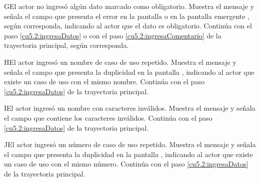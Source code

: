  \begin{UCtrayectoriaA}{G}{El actor no ingresó algún dato marcado como obligatorio.}
    \UCpaso[\UCsist] Muestra el mensaje  y señala el campo que presenta el error en la pantalla 
	     o en la pantalla emergente , según corresponda, indicando al actor que el dato es obligatorio.
    \UCpaso[] Continúa con el paso \ref{cu5.2:ingresaDatos} o con el paso \ref{cu5.2:ingresaComentario} de la trayectoria principal, según corresponda.
 \end{UCtrayectoriaA}
 \begin{UCtrayectoriaA}{H}{El actor ingresó un nombre de caso de uso repetido.}
    \UCpaso[\UCsist] Muestra el mensaje  y señala el campo que presenta la duplicidad en la pantalla 
	    , indicando al actor que existe un caso de uso con el mismo nombre.
    \UCpaso[] Continúa con el paso \ref{cu5.2:ingresaDatos} de la trayectoria principal.
 \end{UCtrayectoriaA}
 \begin{UCtrayectoriaA}{I}{El actor ingresó un nombre con caracteres inválidos.}
    \UCpaso[\UCsist] Muestra el mensaje  y señala el campo que contiene los caracteres inválidos.
    \UCpaso[] Continúa con el paso \ref{cu5.2:ingresaDatos} de la trayectoria principal.
 \end{UCtrayectoriaA}
 \begin{UCtrayectoriaA}{J}{El actor ingresó un número de caso de uso repetido.}
    \UCpaso[\UCsist] Muestra el mensaje  y señala el campo que presenta la duplicidad en la pantalla 
	    , indicando al actor que existe un caso de uso con el mismo número.
    \UCpaso[] Continúa con el paso \ref{cu5.2:ingresaDatos} de la trayectoria principal.
 \end{UCtrayectoriaA}
